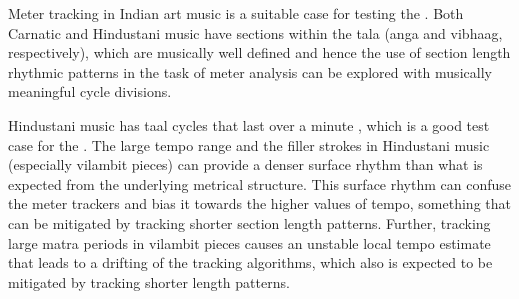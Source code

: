 Meter tracking in Indian art music is a suitable case for testing the \spmodel. Both Carnatic and Hindustani music have sections within the \gls{tala} (\gls{anga} and \gls{vibhaag}, respectively), which are musically well defined and hence the use of section length rhythmic patterns in the task of meter analysis can be explored with musically meaningful cycle divisions. 

Hindustani music has \gls{taal} cycles that last over a minute \cite{clayton:00:time}, which is a good test case for the \spmodel. The large tempo range and the filler strokes in Hindustani music (especially \gls{vilambit} pieces) can provide a denser surface rhythm than what is expected from the underlying metrical structure. This surface rhythm can confuse the meter trackers and bias it towards the higher values of tempo, something that can be mitigated by tracking shorter section length patterns. Further, tracking large \gls{matra} periods in \gls{vilambit} pieces causes an unstable local tempo estimate that leads to a drifting of the tracking algorithms, which also is expected to be mitigated by tracking shorter length patterns.

